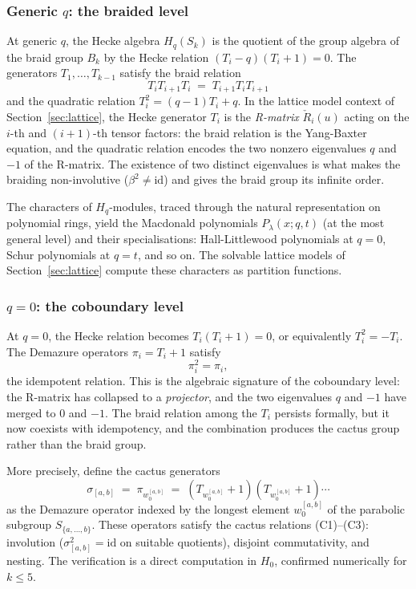 \subsubsection*{Generic $q$: the braided level}

At generic $q$, the Hecke algebra $H_q(S_k)$ is the quotient of the
group algebra of the braid group $B_k$ by the Hecke relation
$(T_i - q)(T_i + 1) = 0$.  The generators $T_1, \ldots, T_{k-1}$
satisfy the braid relation
\[
  T_i T_{i+1} T_i \;=\; T_{i+1} T_i T_{i+1}
\]
and the quadratic relation $T_i^2 = (q-1)T_i + q$.  In the lattice
model context of Section~\ref{sec:lattice}, the Hecke generator $T_i$
is the \emph{R-matrix} $\check{R}_i(u)$ acting on the $i$-th and
$(i+1)$-th tensor factors: the braid relation is the Yang-Baxter
equation, and the quadratic relation encodes the two nonzero eigenvalues
$q$ and $-1$ of the R-matrix.  The existence of two distinct eigenvalues
is what makes the braiding non-involutive ($\beta^2 \neq \mathrm{id}$)
and gives the braid group its infinite order.

The characters of $H_q$-modules, traced through the natural
representation on polynomial rings, yield the Macdonald polynomials
$P_\lambda(x; q, t)$ (at the most general level) and their
specialisations: Hall-Littlewood polynomials at $q = 0$, Schur
polynomials at $q = t$, and so on.  The solvable lattice models of
Section~\ref{sec:lattice} compute these characters as partition
functions.

\subsubsection*{$q = 0$: the coboundary level}

At $q = 0$, the Hecke relation becomes $T_i(T_i + 1) = 0$, or
equivalently $T_i^2 = -T_i$.  The Demazure operators
$\pi_i = T_i + 1$ satisfy
\begin{equation}
\label{eq:demazure-idem}
  \pi_i^2 = \pi_i,
\end{equation}
the idempotent relation.  This is the algebraic signature of the
coboundary level: the R-matrix has collapsed to a \emph{projector},
and the two eigenvalues $q$ and $-1$ have merged to $0$ and $-1$.
The braid relation among the $T_i$ persists formally, but it now
coexists with idempotency, and the combination produces the cactus
group rather than the braid group.

More precisely, define the cactus generators
\begin{equation}
\label{eq:cactus-from-hecke}
  \sigma_{[a,b]} \;=\; \pi_{w_0^{[a,b]}}
  \;=\; (T_{w_0^{[a,b]}} + 1)(T_{w_0^{[a,b]}} + 1) \cdots
\end{equation}
as the Demazure operator indexed by the longest element $w_0^{[a,b]}$
of the parabolic subgroup $S_{\{a, \ldots, b\}}$.  These operators
satisfy the cactus relations (C1)--(C3):
involution ($\sigma_{[a,b]}^2 = \mathrm{id}$ on suitable quotients),
disjoint commutativity, and nesting.  The verification is a direct
computation in $H_0$, confirmed numerically for $k \leq 5$.

